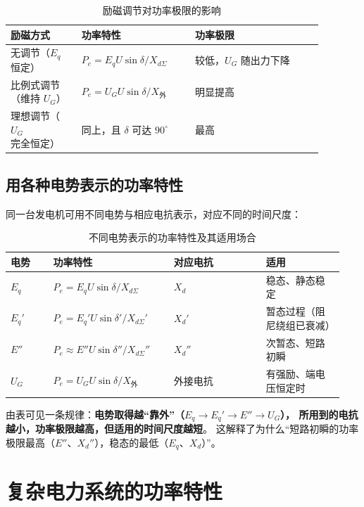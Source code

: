 \begin{table}[htbp]
  \centering
  \caption{励磁调节对功率极限的影响}
  \small
  \begin{tabular}{@{}p{0.20\linewidth}p{0.32\linewidth}p{0.36\linewidth}@{}}
    \toprule
    励磁方式 & 功率特性 & 功率极限 \\
    \midrule
    无调节（$E_q$ 恒定） & $P_e=E_qU\sin\delta/X_{d\Sigma}$ & 较低，$U_G$ 随出力下降 \\
    比例式调节（维持 $U_G$） & $P_e=U_GU\sin\delta/X_{\text{外}}$ & 明显提高 \\
    理想调节（$U_G$ 完全恒定） & 同上，且 $\delta$ 可达 $90^\circ$ & 最高 \\
    \bottomrule
  \end{tabular}
\end{table}

\subsection{用各种电势表示的功率特性}

同一台发电机可用不同电势与相应电抗表示，对应不同的时间尺度：

\begin{table}[htbp]
  \centering
  \caption{不同电势表示的功率特性及其适用场合}
  \small
  \begin{tabular}{@{}p{0.12\linewidth}p{0.34\linewidth}p{0.26\linewidth}p{0.22\linewidth}@{}}
    \toprule
    电势 & 功率特性 & 对应电抗 & 适用 \\
    \midrule
    $E_q$ & $P_e=E_qU\sin\delta/X_{d\Sigma}$ & $X_d$ & 稳态、静态稳定 \\
    $E_q'$ & $P_e=E_q'U\sin\delta'/X_{d\Sigma}'$ & $X_d'$ & 暂态过程（阻尼绕组已衰减） \\
    $E''$ & $P_e\approx E''U\sin\delta''/X_{d\Sigma}''$ & $X_d''$ & 次暂态、短路初瞬 \\
    $U_G$ & $P_e=U_GU\sin\delta/X_{\text{外}}$ & 外接电抗 & 有强励、端电压恒定时 \\
    \bottomrule
  \end{tabular}
\end{table}

由表可见一条规律：\textbf{电势取得越“靠外”（$E_q\to E_q'\to E''\to U_G$），
所用到的电抗越小，功率极限越高，但适用的时间尺度越短}。
这解释了为什么“短路初瞬的功率极限最高（$E''$、$X_d''$），稳态的最低（$E_q$、$X_d$）”。

\section{复杂电力系统的功率特性}

